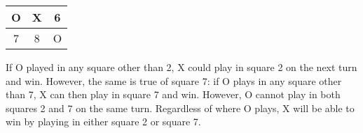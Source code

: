 \documentclass{article}
\begin{document}
\begin{enumerate}
\begin{center}
\begin{tabular}{c|c|c}
                        \hline
                        O & X & 6 \\
                        \hline
                        7 & 8 & O
                  \end{tabular}
            \end{center}
            If O played in any square other than 2, X could play in square 2 on the next turn and win. However, the same is true of square 7: if O plays in any square other than 7, X can then play in square 7 and win.
            However, O cannot play in both squares 2 and 7 on the same turn. Regardless of where O plays, X will be able to win by playing in either square 2 or square 7.

\end{enumerate}
\end{document}
